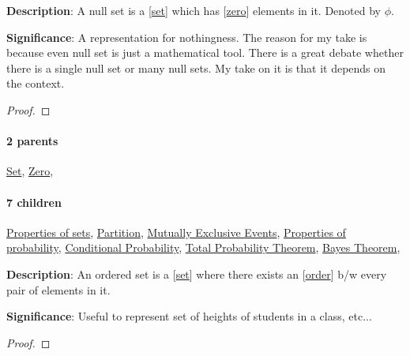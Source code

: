 \documentclass[../main.tex]{subfiles}
\begin{document}
\begin{statement}
\label{statement:Null Set}\hspace*{0pt}\par
\end{statement}
\textbf{Description}:
A null set is a [\hyperref[statement:Set]{set}] which has [\hyperref[statement:Zero]{zero}] elements in it. Denoted by $ \phi $.
\par
{\color{magenta} \textbf{Significance}:
A representation for nothingness.
The reason for my take is because even null set is just a mathematical tool.
There is a great debate whether there is a single null set or many null sets.
My take on it is that it depends on the context.
\par}
\begin{proof}
\proofbydefinition
\end{proof}\par
\paragraph{2 parents} \hyperref[statement:Set]{Set}, \hyperref[statement:Zero]{Zero}, 
\paragraph{7 children} \hyperref[statement:Properties of sets]{Properties of sets}, \hyperref[statement:Partition]{Partition}, \hyperref[statement:Mutually Exclusive Events]{Mutually Exclusive Events}, \hyperref[statement:Properties of probability]{Properties of probability}, \hyperref[statement:Conditional Probability]{Conditional Probability}, \hyperref[statement:Total Probability Theorem]{Total Probability Theorem}, \hyperref[statement:Bayes Theorem]{Bayes Theorem}, 





\begin{statement}
\label{statement:Ordered Set}\hspace*{0pt}\par
\end{statement}
\textbf{Description}:
An ordered set is a [\hyperref[statement:Set]{set}] where there exists an [\hyperref[statement:Order]{order}] b/w every pair of elements in it.
\par
{\color{magenta} \textbf{Significance}:
Useful to represent set of heights of students in a class, etc...
\par}
\begin{proof}
\proofbydefinition
\end{proof}\par
\end{document}
